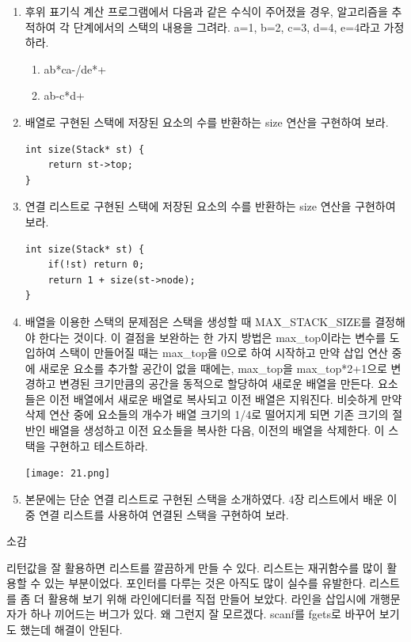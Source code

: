 \documentclass[11pt,a4paper]{article}
\begin{document}
\begin{enumerate}
\item 후위 표기식 계산 프로그램에서 다음과 같은 수식이 주어졌을 경우, 알고리즘을 추적하여 각 단계에서의 스택의 내용을 그려라. a=1, b=2, c=3, d=4, e=4라고 가정하라.
\begin{enumerate}
	\item ab*ca-/de*+
	\item ab-c*d+
\end{enumerate}

\item 배열로 구현된 스택에 저장된 요소의 수를 반환하는 size 연산을 구현하여 보라.
\begin{lstlisting}
int size(Stack* st) {
	return st->top;
}
\end{lstlisting}

\item 연결 리스트로 구현된 스택에 저장된 요소의 수를 반환하는 size 연산을 구현하여 보라.
\begin{lstlisting}
int size(Stack* st) {
	if(!st) return 0;
	return 1 + size(st->node);
}
\end{lstlisting}

\item 배열을 이용한 스택의 문제점은 스택을 생성할 때 MAX\_STACK\_SIZE를 결정해야 한다는 것이다.
이 결점을 보완하는 한 가지 방법은 max\_top이라는 변수를 도입하여 스택이 만들어질 때는 max\_top을 0으로 하여 시작하고 만약 삽입 연산 중에 새로운 요소를 추가할 공간이 없을 때에는, max\_top을 max\_top*2+1으로 변경하고 변경된 크기만큼의 공간을 동적으로 할당하여 새로운 배열을 만든다.
요소들은 이전 배열에서 새로운 배열로 복사되고 이전 배열은 지워진다.
비슷하게 만약 삭제 연산 중에 요소들의 개수가 배열 크기의 1/4로 떨어지게 되면 기존 크기의 절반인 배열을 생성하고 이전 요소들을 복사한 다음, 이전의 배열을 삭제한다.
이 스택을 구현하고 테스트하라.


\texttt{[image: 21.png]}

\item 본문에는 단순 연결 리스트로 구현된 스택을 소개하였다. 4장 리스트에서 배운 이중 연결 리스트를 사용하여 연결된 스택을 구현하여 보라.
\end{enumerate}

\vspace{2cm}
{\Huge 소감}

리턴값을 잘 활용하면 리스트를 깔끔하게 만들 수 있다. 리스트는 재귀함수를 많이 활용할 수 있는 부분이었다. 포인터를 다루는 것은 아직도 많이 실수를 유발한다. 리스트를 좀 더 활용해 보기 위해 라인에디터를 직접 만들어 보았다. 라인을 삽입시에 개행문자가 하나 끼어드는 버그가 있다. 왜 그런지 잘 모르겠다. scanf를 fgets로 바꾸어 보기도 했는데 해결이 안된다.
\end{document}
